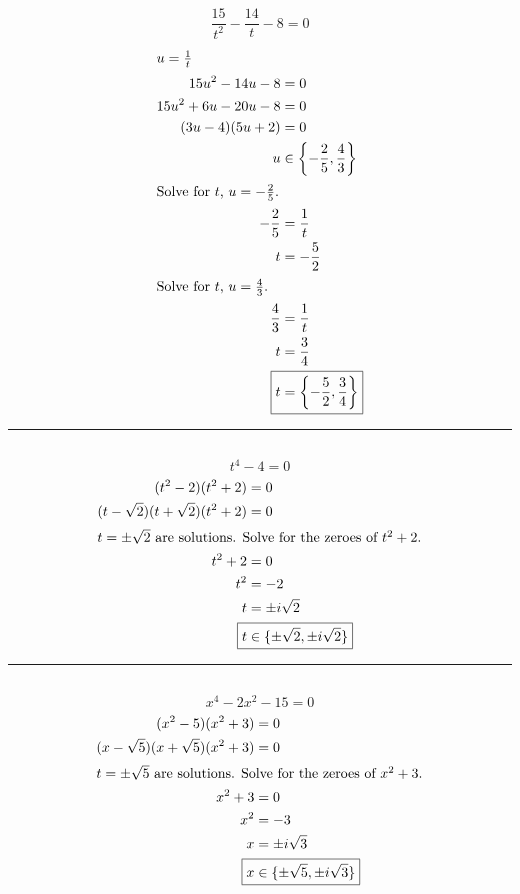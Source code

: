	\subsection{}
		\[\frac{15}{t^2} - \frac{14}{t} - 8 = 0\]
		\begin{align*}
			\intertext{$u = \frac{1}{t}$}
			15u^2 - 14u - 8 &= 0 \\
			15u^2 + 6u - 20u - 8 &= 0 \\
			(3u - 4)(5u + 2) &= 0 \\
			u &\in \left\{-\frac{2}{5}, \frac{4}{3}\right\} \\
			\intertext{Solve for $t$, $u = -\frac{2}{5}$.}
			-\frac{2}{5} &= \frac{1}{t} \\
			t &= -\frac{5}{2} \\
			\intertext{Solve for $t$, $u = \frac{4}{3}$.}
			\frac{4}{3} &= \frac{1}{t} \\
			t &= \frac{3}{4} \\
			\Aboxed{t &= \left\{-\frac{5}{2}, \frac{3}{4}\right\}}
		\end{align*}
		\hrule{}

	\subsection{}
		\[t^4 - 4 = 0\]
		\begin{align*}
			(t^2 - 2)(t^2 + 2) &= 0 \\
			(t - \sqrt{2})(t + \sqrt{2})(t^2 + 2) &= 0 \\
			\intertext{$t = \pm \sqrt{2}$ are solutions. Solve for the zeroes of $t^2 + 2$.}
			t^2 + 2 &= 0 \\
			t^2 &= -2 \\
			t &= \pm i\sqrt{2} \\
			\Aboxed{t &\in \{\pm \sqrt{2}, \pm i\sqrt{2}\}}
		\end{align*}
		\hrule{}

	\subsection{}
		\[x^4 - 2x^2 - 15 = 0\]
		\begin{align*}
			(x^2 - 5)(x^2 + 3) &= 0 \\
			(x - \sqrt{5})(x + \sqrt{5})(x^2 + 3) &= 0 \\
			\intertext{$t = \pm \sqrt{5}$ are solutions. Solve for the zeroes of $x^2 + 3$.}
			x^2 + 3 &= 0 \\
			x^2 &= -3 \\
			x &= \pm i\sqrt{3} \\
			\Aboxed{x &\in \{\pm \sqrt{5}, \pm i\sqrt{3}\}}
		\end{align*}

